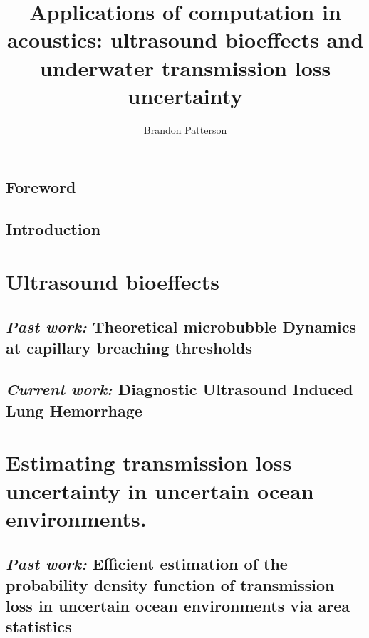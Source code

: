 \documentclass{./tex/thesis-umich}
\title{Applications of computation in acoustics: ultrasound bioeffects and underwater transmission loss uncertainty}
\author{Brandon Patterson}
\begin{document}
\chapter*{Foreword} \label{ch:foreword}



%
\chapter{Introduction} \label{ch:Introduction}

\acresetall

\part{Ultrasound bioeffects} \label{part:ultrasound_bioeffects}


\chapter{\textit{Past work:} Theoretical microbubble Dynamics at capillary breaching thresholds}   \label{ch:usbe_bubble}%
%

% 
\acresetall
%
\chapter{\textit{Current work:} Diagnostic Ultrasound Induced Lung Hemorrhage} \label{ch:usbe_lung}




%



%
\acresetall


\part{Estimating transmission loss uncertainty in uncertain ocean environments.}

\chapter{\textit{Past work:} Efficient estimation of the probability density function of transmission loss in uncertain ocean environments via area statistics}

%
% 
% 
% 
% 
\acresetall




\end{document}
